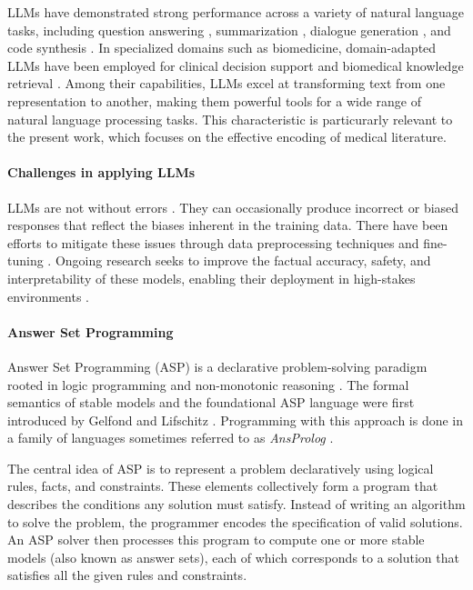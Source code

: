\documentclass[11pt,leqno]{amsart}
\begin{document}
LLMs have demonstrated strong performance across a variety of natural language tasks, 
including question answering \cite{Brown2020}, summarization \cite{Zhang2020}, 
dialogue generation \cite{Thoppilan2022lamda}, and code synthesis \cite{Chen2021}. 
In specialized domains such as biomedicine, domain-adapted LLMs have been employed 
for clinical decision support \cite{Singhal2023} and 
biomedical knowledge retrieval \cite{Luo2022}.
Among their capabilities, LLMs excel at transforming text from one representation to another, 
making them powerful tools for a wide range of natural language processing tasks. 
This characteristic is particurarly relevant to the present work, 
which focuses on the effective encoding of medical literature. \\

\paragraph{\textbf{Challenges in applying LLMs}}

LLMs are not without errors \cite{Raj2023, Ruis2023}. 
They can occasionally produce incorrect or biased responses 
that reflect the biases inherent in the training data. 
There have been efforts to mitigate these issues 
through data preprocessing techniques and fine-tuning \cite{Dodge2021}.
Ongoing research seeks to improve the factual accuracy, safety, and interpretability 
of these models, enabling their deployment in high-stakes environments \cite{Ganguli2022}. \\

\paragraph{\textbf{Answer Set Programming}}

Answer Set Programming (ASP) \cite{Eiter2009} is a declarative problem-solving paradigm 
rooted in logic programming and non-monotonic reasoning \cite{Brewka2011}. 
The formal semantics of stable models and the foundational ASP language 
were first introduced by Gelfond and Lifschitz \cite{Gelfond2000, gel88}.
Programming with this approach is done in a family of languages 
sometimes referred to as \textit{AnsProlog} \cite{Gelfond2002}.

The central idea of ASP is to represent a problem 
declaratively using logical rules, facts, and constraints. 
These elements collectively form a program that describes the conditions any solution must satisfy. 
Instead of writing an algorithm to solve the problem, 
the programmer encodes the specification of valid solutions. 
An ASP solver then processes this program to compute one or more stable models (also known as answer sets),
each of which corresponds to a solution that satisfies all the given rules and constraints.
\end{document}
